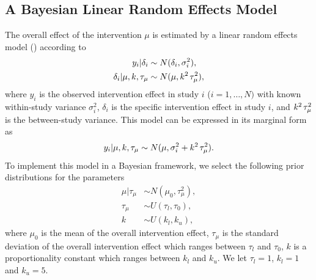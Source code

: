 \documentclass{amsart}
\theoremstyle{plain}%
\begin{document}
\subsection{A Bayesian Linear Random Effects Model} \label{subsection Linear RE}

The overall effect of the intervention $\mu$ is estimated by a linear random effects model () according to
\begin{align}
y_i | \delta_i & \sim N(\delta_i, \sigma_i^2),   \\
\delta_i | \mu, k, \tau_{\mu} & \sim N(\mu, k^2 \hspace{0.5mm} \tau_{\mu}^2), \label{marginal_dist}
\end{align}
where $y_i$ is the observed intervention effect in study $i$ ($i = {1, \dots, N})$ with known within-study variance $\sigma_i^2$,
$\delta_i$ is the specific intervention effect in study $i$, and $k^2 \hspace{0.5mm} \tau_{\mu}^2$ is the between-study variance.
This model can be expressed in its marginal form \citep{Gelman_2013, Rover_2017} as 
\begin{align}
y_i | \mu, k, \tau_{\mu} \sim N(\mu, \sigma_i^2 + k^2 \hspace{0.5mm} \tau_{\mu}^2). 
\end{align}
To implement this model in a Bayesian framework, we select 
the following prior distributions for the parameters  
\begin{align}
\mu | \tau_{\mu} & \sim N(\mu_0,\tau_{\mu}^2), \label{Eq:prior1}  \\
\tau_{\mu} & \sim U(\tau_l,\tau_0), \label{Eq:prior2} \\    
k & \sim  U(k_l, k_u),\label{Eq:prior3} 
\end{align}
where $\mu_0$ is the mean of the overall intervention effect, $\tau_{\mu}$ is the 
standard deviation of the overall intervention effect which ranges between $\tau_l$ 
and $\tau_0$, 
$k$ is a proportionality constant which ranges between $k_l$ 
and $k_u$. 
We let $\tau_l = 1$, $k_l = 1$ and $k_u = 5$.
\end{document}
